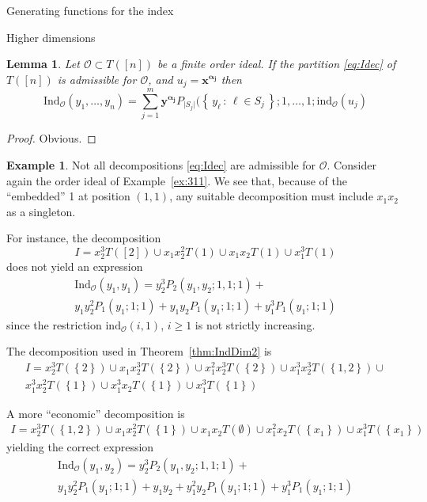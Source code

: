 \documentclass[reqno,a4paper,10pt]{amsart}
\theoremstyle{definition}
\newtheorem{example}[definition]{Example}
\theoremstyle{remark}
\theoremstyle{plain}
\newtheorem{lemma}[definition]{Lemma}
\newcommand{\set}[1]{\left\{{#1}\right\}}
\newcommand{\vek}[1]{\boldsymbol{#1}}
\newcommand\setsuchas[2]{\left\{\,{#1}\,:\,{#2}\,\right\}}
\newcommand{\tdeg}[1]{\lvert #1 \rvert}
\newcommand{\ind}{\mathrm{ind}}
\newcommand{\Ind}{\mathrm{Ind}}
\begin{document}
\begin{section}{Generating functions for the index}
\begin{subsection}{Higher dimensions}
  \begin{lemma}\label{lemma:admiss}
    Let \(\mathcal{O} \subset T([n])\) be a finite order ideal. If the 
    partition \eqref{eq:Idec} of \(T([n])\) is admissible for
    \(\mathcal{O}\), and \(u_j=\vek{x}^{\vek{\alpha_j}}\) then
    \begin{equation}
      \label{eq:IndAdmiss}
      \Ind_{\mathcal{O}}(y_1,\dots,y_n) = \sum_{j=1}^m
      \vek{y}^{\vek{\alpha_j}} P_{\tdeg{S_j}}(\setsuchas{y_\ell}{\ell
        \in S_j};1,\dots,1;\ind_{\mathcal{O}}(u_j)
    \end{equation}
  \end{lemma}
  \begin{proof}
    Obvious.
  \end{proof}


  \begin{example}\label{ex:311cont}
    Not all decompositions \eqref{eq:Idec} are admissible  for
    \(\mathcal{O}\). Consider again the order ideal of
    Example~\ref{ex:311}. 
    We see that, because of the ``embedded'' 1 at position \((1,1)\),
    any suitable decomposition must include \(x_1x_2\) as a singleton.
    

    For instance, the 
    decomposition
    \begin{displaymath}
      I = x_2^3 T([2]) \cup x_1x_2^2 T({1}) \cup x_1x_2 T({1}) \cup
      x_1^3 T({1}) 
    \end{displaymath}
    does not yield an expression
    \begin{multline*}
      \Ind_{\mathcal{O}}(y_1,y_1) = y_2^3 P_2(y_1,y_2;1,1;1) + \\
      y_1y_2^2 P_1(y_1;1;1)  + y_1y_2 P_1(y_1;1;1) +
      y_1^3 P_1(y_1;1;1)
    \end{multline*}
    since the restriction \(\ind_{\mathcal{O}}(i,1)\), \(i \ge 1\) is
    not strictly increasing.


    The decomposition used in Theorem~\ref{thm:IndDim2} is
    \begin{multline*}
      I = x_2^3 T(\set{2}) \cup x_1x_2^3 T(\set{2}) \cup x_1^2x_2^3 T(\set{2}) \cup
      x_1^3x_2^3 T(\set{1,2}) 
      \cup  \\
      x_1^3x_2^2 T(\set{1}) \cup 
      x_1^3x_2 T(\set{1}) \cup 
      x_1^3 T(\set{1}) 
    \end{multline*}
    
    A more ``economic'' decomposition is 
    \begin{multline*}
      I =  x_2^3 T(\set{1,2}) \cup x_1x_2^2 T(\set{1}) \cup
      x_1x_2T(\emptyset) \cup x_1^2x_2 T(\set{x_1}) \cup x_1^3T(\set{x_1})
    \end{multline*}
    yielding the correct expression
    \begin{multline*}
      \Ind_{\mathcal{O}}(y_1,y_2) = y_2^3P_2(y_1,y_2;1,1;1) + \\
      y_1y_2^2P_1(y_1;1;1) + y_1y_2 + y_1^2y_2P_1(y_1;1;1) + y_1^3P_1(y_1;1;1)
    \end{multline*}
  \end{example}



\end{subsection}
\end{section}
\end{document}
